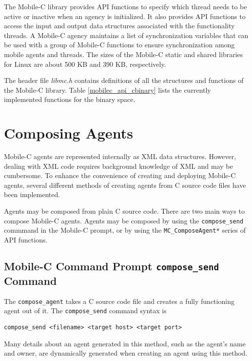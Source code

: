 \documentclass[11pt]{report}
\begin{document}
The Mobile-C library provides API functions to specify which thread needs to 
be active or inactive when an agency is initialized.
It also provides API functions to access the input and output data structures 
associated with the functionality threads.
A Mobile-C agency maintains a list of synchronization variables that can be 
used with a group of Mobile-C functions to ensure synchronization among 
mobile agents and threads.
The sizes of the Mobile-C static and shared libraries for Linux are about 
500 KB and 390 KB, respectively.

The header file \textit{libmc.h} contains definitions of all the structures and 
functions of the Mobile-C library. 
Table \vref{mobilec_api_cbinary} lists the currently implemented functions 
for the binary space.




\chapter{Composing Agents}
Mobile-C agents are represented internally as XML data structures. However,
dealing with XML code requires background knowledge of XML and may be cumbersome.
To enhance the convenience of creating and deploying Mobile-C agents,
several different methods of creating agents from C source code files have
been implemented.

Agents may be composed from plain C source code. There are two main ways to
compose Mobile-C agents. Agents may be composed by using the
\texttt{compose\_send} commmand in the Mobile-C prompt, or by using the
\texttt{MC\_ComposeAgent*} series of API functions.

\section{Mobile-C Command Prompt \texttt{compose\_send} Command}
The \texttt{compose\_agent} takes a C source code file and creates
a fully functioning agent out of it. The \texttt{compose\_send} command
syntax is
\begin{verbatim}
compose_send <filename> <target host> <target port>
\end{verbatim}
Many details about an agent generated in this method, such as the agent's
name and owner, are dynamically generated when creating an agent using 
this method. 
\end{document}
